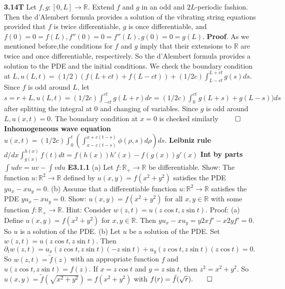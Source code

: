 \documentclass[6pt]{article}
\newcommand{\R}{\mathbb{R}}
\newcommand{\ra}{\rightarrow}
\begin{document}
\begin{multicols}{2}
{\bf 3.14T} Let $f,g: [0,L] \ra \R$. Extend $f$ and $g$ in an odd and $2L$-periodic fashion.  Then the d'Alembert formula provides a solution of the vibrating string equations provided that $f$ is twice differentiable, $g$ is once differentiable, and $f(0)=0=f(L), f''(0)=0=f''(L), g(0)=0=g(L)$. {\bf Proof}. As we mentioned before,the conditions for $f$ and $g$ imply that their extensions to $\R$ are twice and once differentiable, respectively.  So the d'Alembert formula provides a solution to the PDE and the initial conditions.  We check the boundary condition at $L, u(L,t)=(1/2)(f(L+ct)+f(L-ct))+(1/2c)\int_{L-ct}^{L+ct}g(s)ds$. Since $f$ is odd around $L$, let $s = r+L, u(L,t)=(1/2c)\int_{-ct}^{ct}g(L+r)dr=(1/2c)\int_0^{ct}g(L+s)+g(L-s))ds$ after splitting the integral at 0 and changing of variables.  Since $g$ is odd around $L, u(x,t)=0$. The boundary condition at $x=0$ is checked similarly $\qed$ 
{\bf Inhomogeneous wave equation} $u(x,t)=(1/2c)\int_0^t(\int_{x-c(t-s)}^{x+c(t-s)}\phi(\rho,s)d\rho)ds$.
{\bf Leibniz rule} $d/dx \int_{g(x)}^{h(x)}f(t)dt=f(h(x))h'(x)-f(g(x))g'(x)$
{\bf Int by parts} $\int u dv=uv-\int v du$
{\bf E3.1.1} (a) Let $f:\R_+ \ra \R$ be differentiable.  Show: The function $u: \R^2 \ra \R$ defined by $u(x,y)=f(x^2+y^2)$ satisfies the PDE $yu_x-xu_y=0$. (b) Assume that a differentiable function $u:\R^2 \ra \R$ satisfies the PDE $yu_x-xu_y=0$. Show: $u(x,y)=f(x^2+y^2)$ for all $x,y \in \R$ with some function $f:\R_+\ra \R$.  Hint:  Consider $w(z,t)=u(z\cos t,z \sin t)$.  Proof: (a) Define $u(x,y)=f(x^2+y^2)$ for $x,y \in \R$.  Then $yu_x-xu_y=y2xf'-x2yf'=0$. So $u$ is a solution of the PDE. (b) Let $u$ be a solution of the PDE.  Set $w(z,t)=u(z\cos t,z \sin t)$. Then $\partial_tw(z,t)=u_x(z\cos t,z \sin t)(-z \sin t) + u_y(z\cos t,z \sin t)(z \cos t)=0.$ So $w(z,t)=\tilde{f}(z)$ with an appropriate function $f$ and $u(z \cos t,z \sin t)=f(z)$. If $x = z \cos t$ and $y = z \sin t$, then $z^2 = x^2+y^2$. So $u(x,y)=\tilde{f}(\sqrt{x^2+y^2})=f(x^2+y^2)$ with $f(r)=\tilde{f}(\sqrt{r}). \qed$

\end{multicols}
\end{document}
